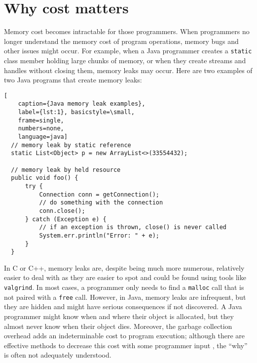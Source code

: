 \section{Why cost matters}
Memory cost becomes intractable for those programmers. When programmers no longer understand the memory cost of program operations,
memory bugs and other issues might occur. For example, when a Java programmer creates a \lstinline{static} class member holding large
chunks of memory, or when they create streams and handles without closing them, memory leaks may occur. Here are two examples of
two Java programs that create memory leaks:

\begin{lstlisting}[
    caption={Java memory leak examples},
    label={lst:1}, basicstyle=\small,
    frame=single,
    numbers=none,
    language=java]
  // memory leak by static reference
  static List<Object> p = new ArrayList<>(33554432);
  
  // memory leak by held resource
  public void foo() {
      try {
          Connection conn = getConnection();
          // do something with the connection
          conn.close();
      } catch (Exception e) {
          // if an exception is thrown, close() is never called
          System.err.println("Error: " + e);
      }
  }
\end{lstlisting}

In C or C++, memory leaks are, despite being much more numerous, relatively easier to deal with as they are easier to spot and could
be found using tools like \lstinline{valgrind}. In most cases, a programmer only needs to find a \lstinline{malloc} call that is not paired
with a \lstinline{free} call. However, in Java, memory leaks are infrequent, but they are hidden and might have serious consequences if
not discovered. A Java programmer might know when and where their object is allocated, but they almost never know when their object dies.
Moreover, the garbage collection overhead adds an indeterminable cost to program execution; although there are effective methods to decrease
this cost with some programmer input \citep{NG2C, PrioritizedGC}, the ``why'' is often not adequately understood.

